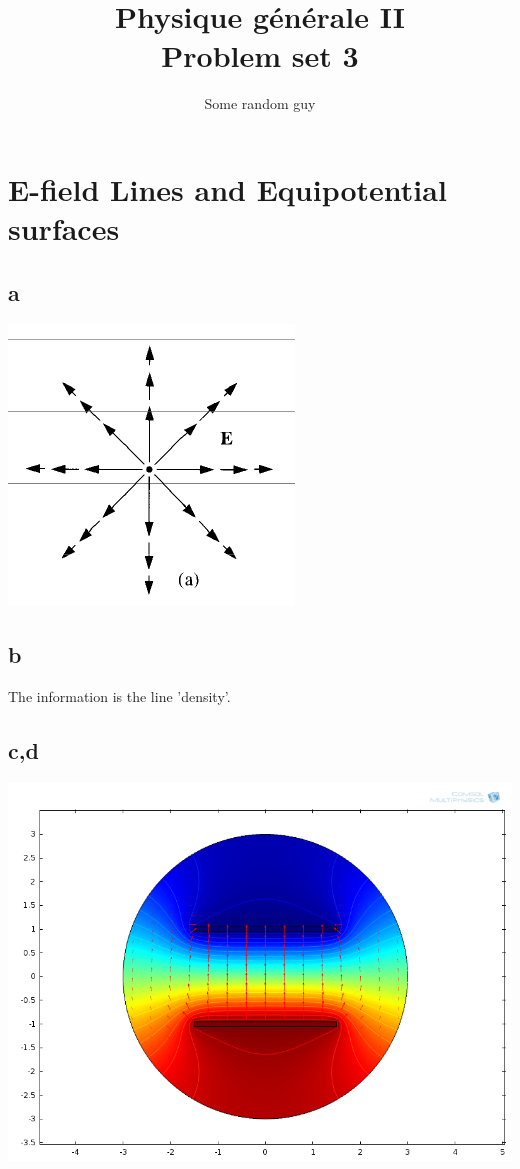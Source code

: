 \documentclass{article}
\begin{document}
\title{Physique g\'en\'erale II\\
Problem set 3}
\author{Some random guy}
\maketitle

\section{E-field Lines and Equipotential surfaces}

\subsection{a}
\includegraphics{ex1-a}

\subsection{b}
The information is the line 'density'.

\subsection{c,d}
\includegraphics[scale=0.5]{ex1-c,d}
\end{document}
